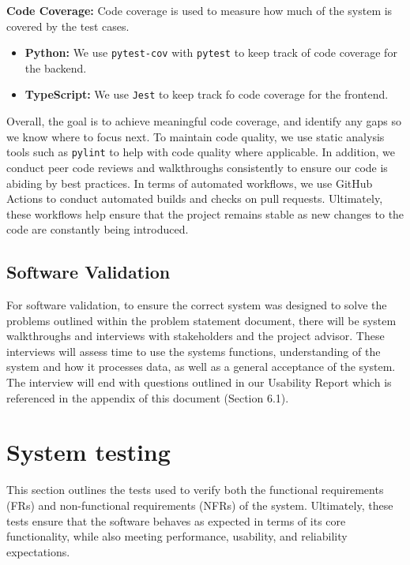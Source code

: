 \documentclass[12pt, titlepage]{article}
\begin{document}
\textbf{Code Coverage:}
Code coverage is used to measure how much of the system is covered by the test cases.

\begin{itemize}
    \item \textbf{Python:} We use \texttt{pytest-cov} with \texttt{pytest} to keep track of code coverage for the backend. 
    
    \item \textbf{TypeScript:} We use \texttt{Jest} to keep track fo code coverage for the frontend.
\end{itemize}
Overall, the goal is to achieve meaningful code coverage, and identify any gaps so we know where to focus next. To maintain code quality, we use static analysis tools such as \texttt{pylint} to help with code quality where applicable. In addition, we conduct peer code reviews and walkthroughs consistently to ensure our code is abiding by best practices. In terms of automated workflows, we use GitHub Actions to conduct automated builds and checks on pull requests. Ultimately, these workflows help ensure that the project remains stable as new changes to the code are constantly being introduced.

\subsection{Software Validation}

For software validation, to ensure the correct system was designed to solve the problems outlined within the problem statement document, there will be system walkthroughs and interviews with stakeholders and the project advisor. These interviews will assess time to use the systems functions, understanding of the system and how it processes data, as well as a general acceptance of the system. The interview will end with questions outlined in our Usability Report which is referenced in the appendix of this document (Section 6.1).

\section{System testing}
This section outlines the tests used to verify both the functional requirements (FRs) and non-functional requirements (NFRs) of the system. Ultimately, these tests ensure that the software behaves as expected in terms of its core functionality, while also meeting performance, usability, and reliability expectations. 
\end{document}
